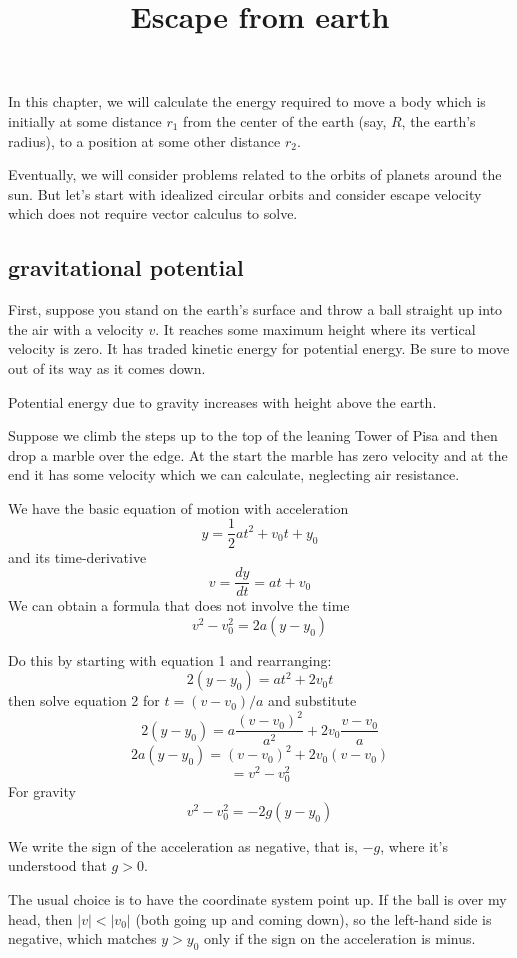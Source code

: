 \documentclass[11pt, oneside]{article}
\title{Escape from earth}
\date{}
\begin{document}
\maketitle
\Large

In this chapter, we will calculate the energy required to move a body which is initially at some distance $r_1$ from the center of the earth (say, $R$, the earth's radius), to a position at some other distance $r_2$.

Eventually, we will consider problems related to the orbits of planets around the sun.  But let's start with idealized circular orbits and consider escape velocity which does not require vector calculus to solve.

\subsection*{gravitational potential}

First, suppose you stand on the earth's surface and throw a ball straight up into the air with a velocity $v$.  It reaches some maximum height where its vertical velocity is zero.  It has traded kinetic energy for potential energy.  Be sure to move out of its way as it comes down.

Potential energy due to gravity increases with height above the earth.

Suppose we climb the steps up to the top of the leaning Tower of Pisa and then drop a marble over the edge.  At the start the marble has zero velocity and at the end it has some velocity which we can calculate, neglecting air resistance.  

We have the basic equation of motion with acceleration
\[ y = \frac{1}{2}at^2 + v_0 t + y_0 \]
and its time-derivative
\[ v = \frac{dy}{dt} = at + v_0 \]
We can obtain a formula that does not involve the time
\[ v^2 - v_0^2 = 2a (y - y_0) \]

Do this by starting with equation 1 and rearranging:
\[ 2(y - y_0) = at^2 + 2v_0 t \]
then solve equation 2 for $t = (v - v_0)/a$ and substitute
\[ 2(y - y_0) = a\frac{(v - v_0)^2}{a^2} + 2v_0 \frac{v - v_0}{a} \]
\[ 2a(y - y_0) = (v - v_0)^2 + 2v_0(v - v_0) \]
\[ = v^2 - v_0^2 \]
For gravity
\[ v^2 - v_0^2 = -2g (y - y_0) \]

We write the sign of the acceleration as negative, that is, $- g$, where it's understood that $g > 0$.  

The usual choice is to have the coordinate system point up.  If the ball is over my head, then $|v| < |v_0|$ (both going up and coming down), so the left-hand side is negative, which matches $y > y_0$ only if the sign on the acceleration is minus.  
\end{document}
